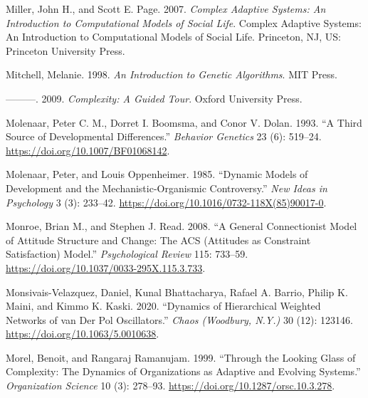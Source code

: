 \documentclass[
  a4paper,
  DIV=11,
  numbers=noendperiod]{scrreprt}
\newlength{\cslhangindent}
\newlength{\cslentryspacingunit} %
\newenvironment{CSLReferences}[2] %
 {%
  \setlength{\parindent}{0pt}
  \ifodd #1
  \let\oldpar\par
  \def\par{\hangindent=\cslhangindent\oldpar}
  \fi
  \setlength{\parskip}{#2\cslentryspacingunit}
 }%
 {}
\begin{document}
\begin{CSLReferences}{1}{0}
\leavevmode{}%
Miller, John H., and Scott E. Page. 2007. \emph{Complex Adaptive
Systems: {An} Introduction to Computational Models of Social Life}.
Complex Adaptive Systems: {An} Introduction to Computational Models of
Social Life. {Princeton, NJ, US}: {Princeton University Press}.

\leavevmode{}%
Mitchell, Melanie. 1998. \emph{An {Introduction} to {Genetic
Algorithms}}. {MIT Press}.

\leavevmode{}%
---------. 2009. \emph{Complexity: {A Guided Tour}}. {Oxford University
Press}.

\leavevmode{}%
Molenaar, Peter C. M., Dorret I. Boomsma, and Conor V. Dolan. 1993. {``A
Third Source of Developmental Differences.''} \emph{Behavior Genetics}
23 (6): 519--24. \url{https://doi.org/10.1007/BF01068142}.

\leavevmode{}%
Molenaar, Peter, and Louis Oppenheimer. 1985. {``Dynamic Models of
Development and the Mechanistic-Organismic Controversy.''} \emph{New
Ideas in Psychology} 3 (3): 233--42.
\url{https://doi.org/10.1016/0732-118X(85)90017-0}.

\leavevmode{}%
Monroe, Brian M., and Stephen J. Read. 2008. {``A General Connectionist
Model of Attitude Structure and Change: {The ACS} ({Attitudes} as
{Constraint Satisfaction}) Model.''} \emph{Psychological Review} 115:
733--59. \url{https://doi.org/10.1037/0033-295X.115.3.733}.

\leavevmode{}%
Monsivais-Velazquez, Daniel, Kunal Bhattacharya, Rafael A. Barrio,
Philip K. Maini, and Kimmo K. Kaski. 2020. {``Dynamics of Hierarchical
Weighted Networks of van Der {Pol} Oscillators.''} \emph{Chaos
(Woodbury, N.Y.)} 30 (12): 123146.
\url{https://doi.org/10.1063/5.0010638}.

\leavevmode{}%
Morel, Benoit, and Rangaraj Ramanujam. 1999. {``Through the {Looking
Glass} of {Complexity}: {The Dynamics} of {Organizations} as {Adaptive}
and {Evolving Systems}.''} \emph{Organization Science} 10 (3): 278--93.
\url{https://doi.org/10.1287/orsc.10.3.278}.


\end{CSLReferences}
\end{document}
